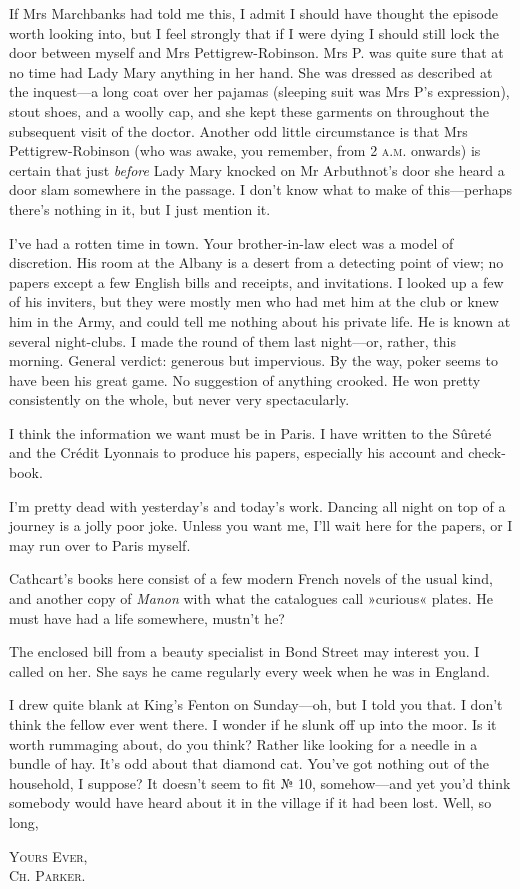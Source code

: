 If Mrs Marchbanks had told me this, I admit I should have thought the episode worth looking into, but I feel strongly that if I were dying I should still lock the door between myself and Mrs Pettigrew-Robinson.  Mrs P. was quite sure that at no time had Lady Mary anything in her hand. She was dressed as described at the inquest\allowbreak---\allowbreak a long coat over her pajamas (sleeping suit was Mrs P's expression), stout shoes, and a woolly cap, and she kept these garments on throughout the subsequent visit of the doctor. Another odd little circumstance is that Mrs  Pettigrew-Robinson (who was awake, you remember, from 2 \textsc{a.m.} onwards) is certain that just \textit{before} Lady Mary knocked on Mr Arbuthnot's door she heard a door slam somewhere in the passage. I don't know what to make of this\allowbreak---\allowbreak perhaps there's nothing in it, but I just mention it.

I've had a rotten time in town. Your brother-in-law elect was a model of discretion. His room at the Albany is a desert from a detecting point of view; no papers except a few English bills and receipts, and invitations. I looked up a few of his inviters, but they were mostly men who had met him at the club or knew him in the Army, and could tell me nothing about his private life. He is known at several night-clubs. I made the round of them last night\allowbreak---\allowbreak or, rather, this morning. General verdict: generous but impervious. By the way, poker seems to have been his great game. No suggestion of anything crooked.  He won pretty consistently on the whole, but never very spectacularly.

I think the information we want must be in Paris. I have written to the Sûreté and the Crédit Lyonnais to produce his papers, especially his account and check-book.

I'm pretty dead with yesterday's and today's work. Dancing all night on top of a journey is a jolly poor joke. Unless you want me, I'll wait here for the papers, or I may run over to Paris myself.

Cathcart's books here consist of a few modern French novels of the usual kind, and another copy of \textit{Manon} with what the catalogues call »curious« plates. He must have had a life somewhere, mustn't he?

The enclosed bill from a beauty specialist in Bond Street may interest you. I called on her. She says he came regularly every week when he was in England.

I drew quite blank at King's Fenton on Sunday\allowbreak---\allowbreak oh, but I told you that. I don't think the fellow ever went there. I wonder if he slunk off up into the moor. Is it worth rummaging about, do you think?  Rather like looking for a needle in a bundle of hay. It's odd about that diamond cat. You've got nothing out of the household, I suppose?  It doesn't seem to fit № 10, somehow\allowbreak---\allowbreak and yet you'd think somebody would have heard about it in the village if it had been lost. Well, so long,

\begin{flushright}
\textsc{Yours Ever,}\\
\textsc{Ch. Parker.}
\end{flushright}
